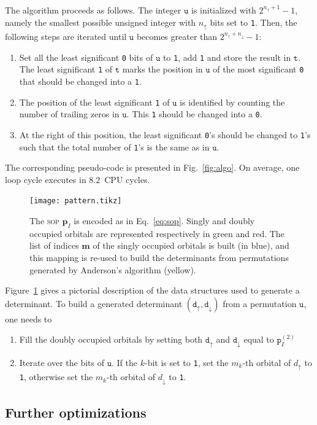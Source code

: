 \documentclass[aip,jcp,reprint,showkeys]{revtex4-1}
\newcommand{\tu}{\mathtt{u}}
\newcommand{\ttt}{\mathtt{t}}
\newcommand{\md}{\mathtt{d}}
\newcommand{\mpp}{\mathtt{p}}
\newcommand{\mpv}{\mathbf{p}}
\newcommand{\up}{\uparrow}
\newcommand{\dn}{\downarrow}
\newcommand{\one}{{\texttt{1}}}
\newcommand{\zero}{{\texttt{0}}}
\newcommand{\sop}{\textsc{sop}}
\begin{document}
The algorithm proceeds as follows. The integer $\tu$ is initialized with
$2^{n_\up+1}-1$, namely the smallest possible unsigned integer with $n_\up$
bits set to \one. 
Then, the following steps are iterated until $\tu$ becomes
greater than $2^{n_\up+n_\dn}-1$:
\begin{enumerate}
    \item Set all the least significant \zero{} bits of $\tu$ to \one{}, add \one{} and store the result in $\ttt$. The least significant \one{} of $\ttt$ marks the position in $\tu$ of the most significant \zero{} that should be changed into a \one{}.
    \item The position of the least significant \one{} of $\tu$ is identified by counting the number of trailing zeros in $\tu$. This \one{} should be changed into a \zero{}.
    \item At the right of this position, the least significant \zero's should be changed to \one's such that the total number of \one's is the same as in $\tu$.
\end{enumerate}
The corresponding pseudo-code is presented in Fig.~\ref{fig:algo}. On average, one loop cycle executes in $8.2$~CPU cycles.

\begin{figure}[t]
\texttt{[image: pattern.tikz]} 
\caption{The {\sop} $\mpv_I$ is encoded as in Eq.~\eqref{eq:sop}. Singly and doubly
occupied orbitals are represented respectively in green and red.
The list of indices $\mathbf{m}$ of the singly occupied orbitals is built (in blue), and this
mapping is re-used to build the determinants from permutations generated by Anderson's algorithm (yellow).}
\label{fig:mapping}
\end{figure}

Figure~\ref{fig:mapping} gives a pictorial description of the data structures used to generate a determinant.
To build a generated determinant $(\md_\up,\md_\dn)$ from a permutation $\tu$, one needs to
\begin{enumerate}
    \item Fill the doubly occupied orbitals by setting both $\md_\up$ and $\md_\dn$
          equal to $\mpp_I^{(2)}$
    \item Iterate over the bits of $\tu$. If the $k$-bit is set to \one{}, set the $m_k$-th orbital of $d_\up$ to \one, otherwise set the $m_k$-th orbital of $d_\dn$ to \one.
\end{enumerate}

\subsection{Further optimizations}
\end{document}
